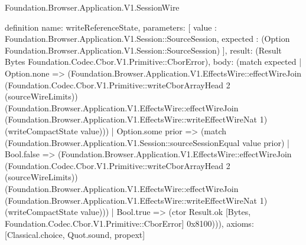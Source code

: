 \begin{lexlean}{Foundation.Browser.Application.V1.SessionWire}
\begin{semanticmodule}
definition{
  name: writeReferenceState,
  parameters: [
    value : Foundation.Browser.Application.V1.Session::SourceSession,
    expected : (Option Foundation.Browser.Application.V1.Session::SourceSession)
  ],
  result: (Result Bytes Foundation.Codec.Cbor.V1.Primitive::CborError),
  body: (match expected
    | Option.none => (Foundation.Browser.Application.V1.EffectsWire::effectWireJoin (Foundation.Codec.Cbor.V1.Primitive::writeCborArrayHead 2 (sourceWireLimits)) (Foundation.Browser.Application.V1.EffectsWire::effectWireJoin (Foundation.Browser.Application.V1.EffectsWire::writeEffectWireNat 1) (writeCompactState value)))
    | Option.some prior => (match (Foundation.Browser.Application.V1.Session::sourceSessionEqual value prior)
      | Bool.false => (Foundation.Browser.Application.V1.EffectsWire::effectWireJoin (Foundation.Codec.Cbor.V1.Primitive::writeCborArrayHead 2 (sourceWireLimits)) (Foundation.Browser.Application.V1.EffectsWire::effectWireJoin (Foundation.Browser.Application.V1.EffectsWire::writeEffectWireNat 1) (writeCompactState value)))
      | Bool.true => (ctor Result.ok [Bytes, Foundation.Codec.Cbor.V1.Primitive::CborError] 0x8100))),
  axioms: [Classical.choice, Quot.sound, propext]
}


\end{semanticmodule}
\end{lexlean}
